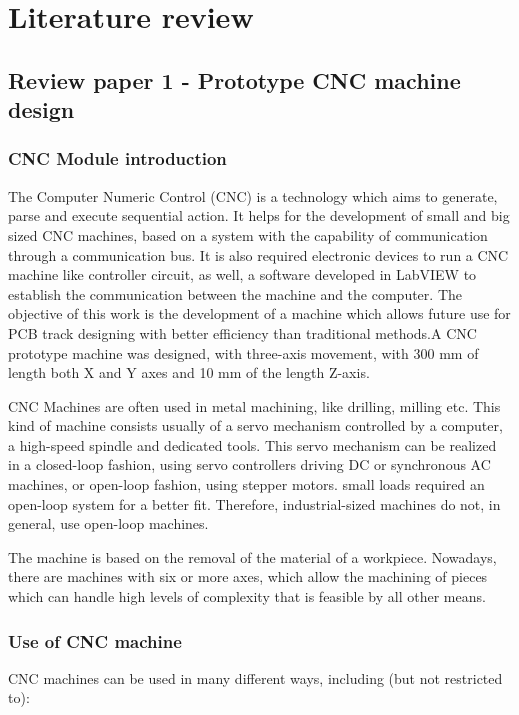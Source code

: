 \chapter{Literature review} \label{chapter2}

\section{Review paper 1 - Prototype CNC machine design} 

\subsection{CNC Module introduction}
The Computer Numeric Control (CNC) \cite{ieee_pap} is a technology which aims to generate, parse and execute sequential action. It helps for the development of small and big sized CNC machines, based on a system with the capability of communication through a communication bus. It is also required electronic devices to run a CNC machine like controller circuit, as well, a software developed in LabVIEW to establish the communication between the machine and the computer. The objective of this work is the development of a machine which allows future use for PCB track designing with better efficiency than traditional methods.A CNC prototype machine was designed, with three-axis movement, with 300 mm of length both X and Y axes and 10 mm of the length Z-axis. \par

CNC Machines are often used in metal machining, like drilling, milling etc. This kind of machine consists usually of a servo mechanism controlled by a computer, a high-speed spindle and dedicated tools. This servo mechanism can be realized in a closed-loop fashion, using servo controllers driving DC or synchronous AC machines, or open-loop fashion, using stepper motors. small loads required an open-loop system for a better fit. Therefore, industrial-sized machines do not, in general, use open-loop machines. \par

The machine is based on the removal of the material of a workpiece. Nowadays, there are machines with six or more axes, which allow the machining of pieces which can handle high levels of complexity that is feasible by all other means.


\subsection{Use of CNC machine}
CNC machines can be used in many different ways, including (but not restricted to):

